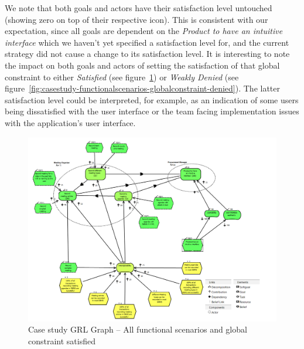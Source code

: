 \documentclass[dissertation,final]{softeng}
\begin{document}
We note that both goals and actors have their satisfaction level untouched (showing zero on top of their respective icon). This is consistent with our expectation, since all goals are dependent on the \emph{Product to have an intuitive interface} which we haven't yet specified a satisfaction level for, and the current strategy did not cause a change to its satisfaction level. It is interesting to note the impact on both goals and actors of setting the satisfaction of that global constraint to either \emph{Satisfied} (see figure~\ref{fig:casestudy-functionalscenarios-globalconstraint}) or \emph{Weakly Denied} (see figure~\ref{fig:casestudy-functionalscenarios-globalconstraint-denied}). The latter satisfaction level could be interpreted, for example, as an indication of some users being dissatisfied with the user interface or the team facing implementation issues with the application's user interface.

\begin{figure}
\includegraphics[width=\columnwidth]{casestudy-functionalscenarios-globalconstraint}
\centering
\caption{Case study GRL Graph -- All functional scenarios and global constraint satisfied}
\label{fig:casestudy-functionalscenarios-globalconstraint}
\end{figure} 
\end{document}
